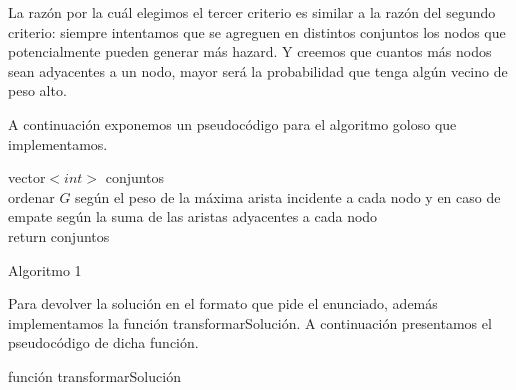 \documentclass[11pt, a4paper, twoside]{article}
\begin{document}
\begin{enumerate}
\begin{enumerate}
			La razón por la cuál elegimos el tercer criterio es similar a la razón del segundo criterio: siempre intentamos que
			se agreguen en distintos conjuntos los nodos que potencialmente pueden generar más hazard. Y creemos que cuantos más
			nodos sean adyacentes a un nodo, mayor será la probabilidad que tenga algún vecino de peso alto.
			
			
		\end{enumerate}
		
		A continuación exponemos un pseudocódigo para el algoritmo goloso que implementamos. \\
		\begin{algorithm}[H]
		  vector$<int>$ conjuntos \\
		  ordenar $G$ según el peso de la máxima arista incidente a cada nodo y en caso de empate según la suma
		  de las aristas adyacentes a cada nodo \\
		  return conjuntos
		\caption{Algoritmo 1}
		\end{algorithm}
		
		Para devolver la solución en el formato que pide el enunciado, además implementamos la función transformarSolución.
		A continuación presentamos el pseudocódigo de dicha función.
		\begin{algorithm}[H]
		\caption{función transformarSolución}
		\end{algorithm}
		

\end{enumerate}
\end{document}

